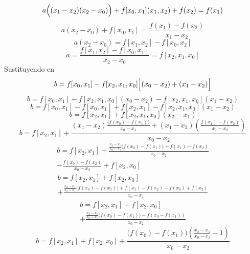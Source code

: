 \begin{equation*}
    a\Bigl((x_1-x_2)(x_2-x_0)\Bigr)+f[x_0,x_1](x_1,x_2)+f(x_2)=f(x_1)
\end{equation*}
\begin{equation*}
    a(x_2-x_0)+f[x_0,x_1]=\frac{f(x_1)-f(x_2)}{x_1-x_2}
\end{equation*}
\begin{equation*}
    a(x_2-x_0)=f[x_1,x_2]-f[x_0,x_2]
\end{equation*}
\begin{equation}
    \label{eq5_muller}
    a=\frac{f[x_1,x_2]-f[x_0,x_1]}{x_2-x_0}=f[x_2,x_1,x_0]
\end{equation}
Sustituyendo  en 
\begin{equation*}
    b=f[x_0,x_1]-f[x_2,x_1,x_0]\Bigl[(x_0-x_2)+(x_1-x_2)\Bigr]
\end{equation*}
\begin{equation*}
    b=f[x_0,x_1]-f[x_2,x_1,x_0](x_0-x_2)-f[x_2,x_1,x_0](x_1-x_2)
\end{equation*}
\begin{equation*}
    b=f[x_0,x_1]-f[x_0,x_1]+f[x_2,x_1]-f[x_2,x_1,x_0](x_1-x_2)
\end{equation*}
\begin{equation*}
    b=f[x_2,x_1]+f[x_2,x_1,x_0](x_2-x_1)
\end{equation*}
\begin{equation*}
    b=f[x_2,x_1]+\frac{(x_1-x_2)\frac{\bigl(f(x_0)-f(x_1)\bigr)}{x_0-x_1}+(x_1-x_2)\left(\frac{f(x_1)-f(x_2)}{x_1-x_2}\right)}{x_0-x_2}
\end{equation*}
\begin{multline*}
    b=f[x_2,x_1]+\frac{\frac{x_2-x_1}{x_0-x_1}\bigl(f(x_0)-f(x_1)\bigr)+f(x_1)-f(x_2)}{x_0-x_2}\\
    -\frac{f(x_0)-f(x_2)}{x_0-x_2}+f[x_2,x_0]
\end{multline*}
\begin{multline*}
    b=f[x_2,x_1]+f[x_2,x_0]\\
    +\frac{\frac{x_2-x_1}{x_0-x_1}\bigl(f(x_0)-f(x_1)\bigr)+f(x_1)-f(x_2)-f(x_0)+f(x_2)}{x_0-x_2}
\end{multline*}
\begin{multline*}
    b=f[x_2,x_1]+f[x_2,x_0]\\
    +\frac{\frac{x_2-x_1}{x_0-x_1}\bigl(f(x_0)-f(x_1)\bigr)-f(x_0-f(x_1))}{x_0-x_2}
\end{multline*}
\begin{equation*}
    b=f[x_2,x_1]+f[x_2,x_0]+\frac{\bigl(f(x_0)-f(x_1)\bigr)\left(\frac{x_2-x_1}{x_0-x_1}-1\right)}{x_0-x_2}
\end{equation*}
